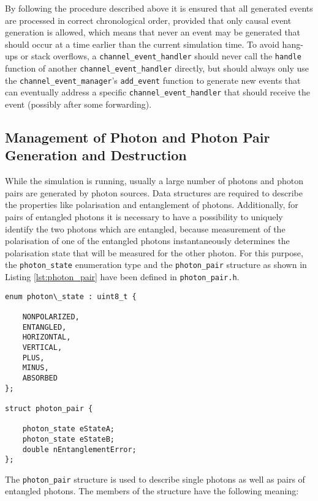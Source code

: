 By following the procedure described above it is ensured that all generated events are processed in correct chronological order, provided that only causal event generation is allowed, which means that never an event may be generated that should occur at a time earlier than the current simulation time. To avoid hang-ups or stack overflows, a \texttt{channel\_event\_handler} should never call the \texttt{handle} function of another \texttt{channel\_event\_handler} directly, but should always only use the \texttt{channel\_event\_manager}'s \texttt{add\_event} function to generate new events that can eventually address a specific \texttt{channel\_event\_handler} that should receive the event (possibly after some forwarding).

\subsection{Management of Photon and Photon Pair Generation and Destruction}
\label{subsec:concepts_photons}

While the simulation is running, usually a large number of photons and photon pairs are generated by photon sources. Data structures are required to describe the properties like polarisation and entanglement of photons. Additionally, for pairs of entangled photons it is necessary to have a possibility to uniquely identify the two photons which are entangled, because measurement of the polarisation of one of the entangled photons instantaneously determines the polarisation state that will be measured for the other photon. For this purpose, the \texttt{photon\_state} enumeration type and the \texttt{photon\_pair} structure as shown in Listing \ref{lst:photon_pair} have been defined in \texttt{photon\_pair.h}.

\begin{lstlisting}[caption={Definition of the \texttt{photon\_state} enumeration type and the \texttt{photon\_pair} structure}, captionpos=b, label={lst:photon_pair}]
enum photon\_state : uint8_t {
    
    NONPOLARIZED,
    ENTANGLED,
    HORIZONTAL,
    VERTICAL,
    PLUS,
    MINUS,
    ABSORBED
};

struct photon_pair {
    
    photon_state eStateA;
    photon_state eStateB;
    double nEntanglementError;
};
\end{lstlisting}

The \texttt{photon\_pair} structure is used to describe single photons as well as pairs of entangled photons. The members of the structure have the following meaning:

